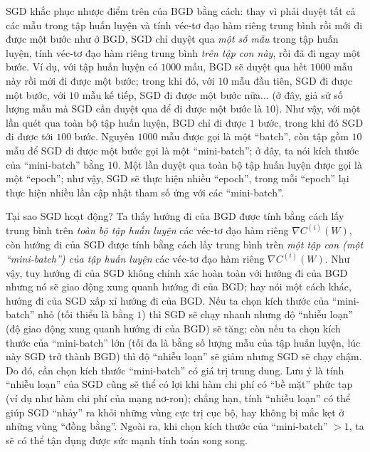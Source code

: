 SGD khắc phục nhược điểm trên của BGD bằng cách: thay vì phải duyệt tất cả các mẫu trong tập huấn luyện và tính véc-tơ đạo hàm riêng trung bình rồi mới đi được một bước như ở BGD, SGD chỉ duyệt qua \emph{một số mẫu} trong tập huấn luyện, tính véc-tơ đạo hàm riêng trung bình \emph{trên tập con này}, rồi đã đi ngay một bước. Ví dụ, với tập huấn luyện có $1000$ mẫu, BGD sẽ duyệt qua hết $1000$ mẫu này rồi mới đi được một bước; trong khi đó, với $10$ mẫu đầu tiên, SGD đi được một bước, với $10$ mẫu kế tiếp, SGD đi được một bước nữa... (ở đây, giả sử số lượng mẫu mà SGD cần duyệt qua để đi được một bước là $10$). Như vậy, với một lần quét qua toàn bộ tập huấn luyện, BGD chỉ đi được $1$ bước, trong khi đó SGD đi được tới $100$ bước. Nguyên $1000$ mẫu được gọi là một ``batch'', còn tập gồm $10$ mẫu để SGD đi được một bước gọi là một ``mini-batch''; ở đây, ta nói kích thước của ``mini-batch'' bằng $10$. Một lần duyệt qua toàn bộ tập huấn luyện được gọi là một ``epoch''; như vậy, SGD sẽ thực hiện nhiều ``epoch'', trong mỗi ``epoch'' lại thực hiện nhiều lần cập nhật tham số ứng với các ``mini-batch''.

Tại sao SGD hoạt động? Ta thấy hướng đi của BGD được tính bằng cách lấy trung bình trên \emph{toàn bộ tập huấn luyện} các véc-tơ đạo hàm riêng $\nabla C^{(i)}(W)$, còn hướng đi của SGD được tính bằng cách lấy trung bình trên \emph{một tập con (một ``mini-batch'') của tập huấn luyện} các véc-tơ đạo hàm riêng $\nabla C^{(i)}(W)$. Như vậy, tuy hướng đi của SGD không chính xác hoàn toàn với hướng đi của BGD nhưng nó sẽ giao động xung quanh hướng đi của BGD; hay nói một cách khác, hướng đi của SGD xấp xỉ hướng đi của BGD. Nếu ta chọn kích thước của ``mini-batch'' nhỏ (tối thiểu là bằng $1$) thì SGD sẽ chạy nhanh nhưng độ ``nhiễu loạn'' (độ giao động xung quanh hướng đi của BGD) sẽ tăng; còn nếu ta chọn kích thước của ``mini-batch'' lớn (tối đa là bằng số lượng mẫu của tập huấn luyện, lúc này SGD trở thành BGD) thì độ ``nhiễu loạn'' sẽ giảm nhưng SGD sẽ chạy chậm. Do đó, cần chọn kích thước ``mini-batch'' có giá trị trung dung. Lưu ý là tính ``nhiễu loạn'' của SGD cũng sẽ thể có lợi khi hàm chi phí có ``bề mặt'' phức tạp (ví dụ như hàm chi phí của mạng nơ-ron); chẳng hạn, tính ``nhiễu loạn'' có thể giúp SGD ``nhảy'' ra khỏi những vùng cực trị cục bộ, hay không bị mắc kẹt ở những vùng ``đồng bằng''. Ngoài ra, khi chọn kích thước của ``mini-batch'' $>1$, ta sẽ có thể tận dụng được sức mạnh tính toán song song.

